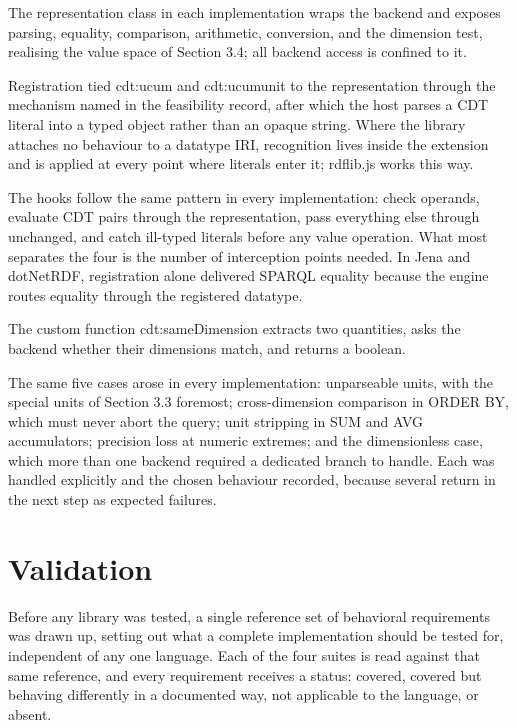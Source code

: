 The representation class in each implementation wraps the backend and exposes parsing, equality, comparison, arithmetic, conversion, and the dimension test, realising the value space of Section 3.4; all backend access is confined to it.

Registration tied cdt:ucum and cdt:ucumunit to the representation through the mechanism named in the feasibility record, after which the host parses a CDT literal into a typed object rather than an opaque string. Where the library attaches no behaviour to a datatype IRI, recognition lives inside the extension and is applied at every point where literals enter it; rdflib.js works this way.

The hooks follow the same pattern in every implementation: check operands, evaluate CDT pairs through the representation, pass everything else through unchanged, and catch ill-typed literals before any value operation. What most separates the four is the number of interception points needed. In Jena and dotNetRDF, registration alone delivered SPARQL equality because the engine routes equality through the registered datatype.

The custom function cdt:sameDimension extracts two quantities, asks the backend whether their dimensions match, and returns a boolean.

The same five cases arose in every implementation: unparseable units, with the special units of Section 3.3 foremost; cross-dimension comparison in ORDER BY, which must never abort the query; unit stripping in SUM and AVG accumulators; precision loss at numeric extremes; and the dimensionless case, which more than one backend required a dedicated branch to handle. Each was handled explicitly and the chosen behaviour recorded, because several return in the next step as expected failures.

\section{Validation}

Before any library was tested, a single reference set of behavioral requirements was drawn up, setting out what a complete implementation should be tested for, independent of any one language. Each of the four suites is read against that same reference, and every requirement receives a status: covered, covered but behaving differently in a documented way, not applicable to the language, or absent. 

